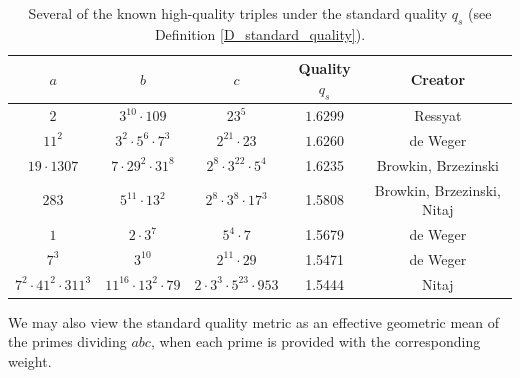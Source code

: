 \documentclass[11pt,letterpaper]{amsart}
\begin{document}
\begin{table}[t]
    \centering
    \begin{tabular}{|c|c|c|c|c|}
    \hline
        $a$ & $b$ & $c$ & \textbf{Quality $q_s$} & \textbf{Creator} \\
    \hline
        $2$ & $3^{10} \cdot 109$ & $23^5$ & $1.6299$ & Ressyat \cite{waldschmidt2015}\\
        $11^2$ & $3^2 \cdot 5^6 \cdot 7^3$ & $2^{21} \cdot 23$ & $1.6260$ & de Weger \cite{deweger1989}\\
        $19 \cdot 1307$ & $7 \cdot 29^2 \cdot 31^8$ & $2^8 \cdot 3^{22} \cdot 5^4$ & 1.6235 & Browkin, Brzezinski \cite{browkin1994} \\
        $283$ & $5^{11} \cdot 13^2$ & $2^8 \cdot 3^8 \cdot 17^3$ & 1.5808 & Browkin, Brzezinski, Nitaj \cite{nitaj1993-algorithms, browkin1994} \\
        $1$ & $2 \cdot 3^7$ & $5^4 \cdot 7$ & 1.5679 & de Weger \cite{deweger1989} \\
        $7^3$ & $3^{10}$ & $2^{11} \cdot 29$ & 1.5471 & de Weger \cite{deweger1989}\\
        $7^2 \cdot 41^2 \cdot 311^3$ & $11^{16}\cdot 13^2 \cdot 79$ & $2\cdot 3^3\cdot 5^{23}\cdot 953$ & 1.5444 & Nitaj \cite{nitaj1993-algorithms} \\ \hline
    \end{tabular}
    \caption{Several of the known high-quality triples under the standard quality $q_s$ (see Definition \ref{D_standard_quality}).}
    \label{tab1}
\end{table}

We may also view the standard quality metric as an effective geometric mean of the primes dividing $abc$, when each prime is provided with the corresponding weight.
\end{document}
